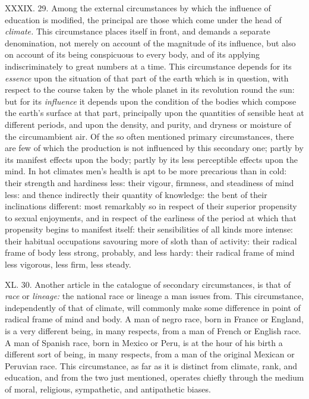 \documentclass[12pt]{report}
\begin{document}
XXXIX. 29. Among the external circumstances by which the influence of
education is modified, the principal are those which come under the head
of \emph{climate.} This circumstance places itself in front, and demands
a separate denomination, not merely on account of the magnitude of its
influence, but also on account of its being conspicuous to every body,
and of its applying indiscriminately to great numbers at a time. This
circumstance depends for its \emph{essence} upon the situation of that
part of the earth which is in question, with respect to the course taken
by the whole planet in its revolution round the sun: but for its
\emph{influence} it depends upon the condition of the bodies which
compose the earth's surface at that part, principally upon the
quantities of sensible heat at different periods, and upon the density,
and purity, and dryness or moisture of the circumambient air. Of the so
often mentioned primary circumstances, there are few of which the
production is not influenced by this secondary one; partly by its
manifest effects upon the body; partly by its less perceptible effects
upon the mind. In hot climates men's health is apt to be more precarious
than in cold: their strength and hardiness less: their vigour, firmness,
and steadiness of mind less: and thence indirectly their quantity of
knowledge: the bent of their inclinations different: most remarkably so
in respect of their superior propensity to sexual enjoyments, and in
respect of the earliness of the period at which that propensity begins
to manifest itself: their sensibilities of all kinds more intense: their
habitual occupations savouring more of sloth than of activity: their
radical frame of body less strong, probably, and less hardy: their
radical frame of mind less vigorous, less firm, less steady.

XL. 30. Another article in the catalogue of secondary circumstances, is
that of \emph{race} or \emph{lineage:} the national race or lineage a
man issues from. This circumstance, independently of that of climate,
will commonly make some difference in point of radical frame of mind and
body. A man of negro race, born in France or England, is a very
different being, in many respects, from a man of French or English race.
A man of Spanish race, born in Mexico or Peru, is at the hour of his
birth a different sort of being, in many respects, from a man of the
original Mexican or Peruvian race. This circumstance, as far as it is
distinct from climate, rank, and education, and from the two just
mentioned, operates chiefly through the medium of moral, religious,
sympathetic, and antipathetic biases.
\end{document}
